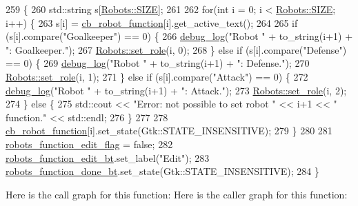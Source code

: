 \begin{DoxyCode}
259                                                             \{
260     std::string s[\hyperlink{class_robots_ae9df2f1d345ad6740f0459956cdd4712}{Robots::SIZE}];
261 
262     \textcolor{keywordflow}{for}(\textcolor{keywordtype}{int} i = 0; i < \hyperlink{class_robots_ae9df2f1d345ad6740f0459956cdd4712}{Robots::SIZE}; i++) \{
263         s[i] = \hyperlink{class_robot_g_u_i_ab1e977d6ae4bcf57e4306f017695eeeb}{cb\_robot\_function}[i].get\_active\_text();
264 
265         \textcolor{keywordflow}{if} (s[i].compare(\textcolor{stringliteral}{"Goalkeeper"}) == 0) \{
266             \hyperlink{debug_8hpp_afde3f42696113719c9ae35507125ee6e}{debug\_log}(\textcolor{stringliteral}{"Robot "} + to\_string(i+1) + \textcolor{stringliteral}{": Goalkeeper."});
267             \hyperlink{class_robots_a3694b6380b113b7c38a252fd3bbfcca3}{Robots::set\_role}(i, 0);
268         \} \textcolor{keywordflow}{else} \textcolor{keywordflow}{if} (s[i].compare(\textcolor{stringliteral}{"Defense"}) == 0) \{
269             \hyperlink{debug_8hpp_afde3f42696113719c9ae35507125ee6e}{debug\_log}(\textcolor{stringliteral}{"Robot "} + to\_string(i+1) + \textcolor{stringliteral}{": Defense."});
270             \hyperlink{class_robots_a3694b6380b113b7c38a252fd3bbfcca3}{Robots::set\_role}(i, 1);
271         \} \textcolor{keywordflow}{else} \textcolor{keywordflow}{if} (s[i].compare(\textcolor{stringliteral}{"Attack"}) == 0) \{
272             \hyperlink{debug_8hpp_afde3f42696113719c9ae35507125ee6e}{debug\_log}(\textcolor{stringliteral}{"Robot "} + to\_string(i+1) + \textcolor{stringliteral}{": Attack."});
273             \hyperlink{class_robots_a3694b6380b113b7c38a252fd3bbfcca3}{Robots::set\_role}(i, 2);
274         \} \textcolor{keywordflow}{else} \{
275             std::cout << \textcolor{stringliteral}{"Error: not possible to set robot "} << i+1 << \textcolor{stringliteral}{" function."} << std::endl;
276         \}
277 
278         \hyperlink{class_robot_g_u_i_ab1e977d6ae4bcf57e4306f017695eeeb}{cb\_robot\_function}[i].set\_state(Gtk::STATE\_INSENSITIVE);
279     \}
280 
281     \hyperlink{class_robot_g_u_i_afac83e97ea43120de2433cbe27413581}{robots\_function\_edit\_flag} = \textcolor{keyword}{false};
282     \hyperlink{class_robot_g_u_i_ac474c7d61bd07aaf26f75acb691e2971}{robots\_function\_edit\_bt}.set\_label(\textcolor{stringliteral}{"Edit"});
283     \hyperlink{class_robot_g_u_i_a17db9c0ad94bd601734b87c6aff3fcf0}{robots\_function\_done\_bt}.set\_state(Gtk::STATE\_INSENSITIVE);
284 \}
\end{DoxyCode}
Here is the call graph for this function\+:
Here is the caller graph for this function\+:
\mbox{\label{class_robot_g_u_i_a7b15515d7ea036f2b59d62bc6cdc476b}} 
